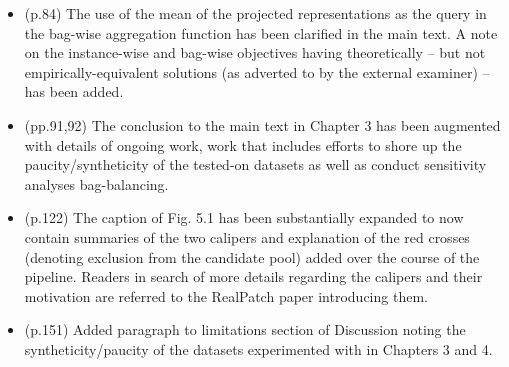 \begin{itemize}
    \item (p.84) The use of the mean of the projected representations as the query in the bag-wise
        aggregation function has been clarified in the main text.
        A note on the instance-wise and bag-wise objectives having theoretically -- but not
        empirically-equivalent solutions (as adverted to by the external examiner) -- has been
        added.
    \item (pp.91,92) The conclusion to the main text in Chapter 3 has been augmented with details
        of ongoing work, work that includes efforts to shore up the paucity/syntheticity of the
        tested-on datasets as well as conduct sensitivity analyses \wrt{} bag-balancing.
    \item (p.122) The caption of Fig. 5.1 has been substantially expanded to now contain summaries
        of the two calipers and explanation of the red crosses (denoting exclusion from the
        candidate pool) added over the course of the pipeline. Readers in search of more details
        regarding the calipers and their motivation are referred to the RealPatch paper introducing
        them.
    \item (p.151) Added paragraph to limitations section of Discussion noting the
        syntheticity/paucity of the datasets experimented with in Chapters 3 and 4.
\end{itemize}
